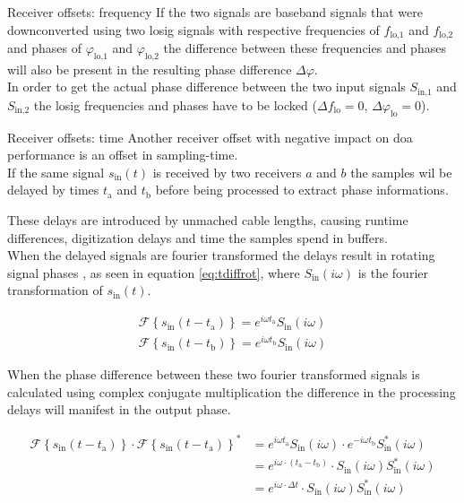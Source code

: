 \begin{subchapter}{Receiver offsets: frequency}
  If the two signals are baseband signals that
  were downconverted using two \gls{losig} signals
  with respective frequencies of $f_\text{lo,1}$ and
  $f_\text{lo,2}$ and phases of $\varphi_\text{lo,1}$
  and $\varphi_\text{lo,2}$ the difference between
  these frequencies and phases will also be present
  in the resulting phase difference $\Delta \varphi$. \\

  In order to get the actual phase difference between
  the two input signals $S_\text{in,1}$ and $S_\text{in,2}$
  the \gls{losig} frequencies and phases have to be
  locked ($\Delta f_\text{lo} = 0$, $\Delta \varphi_\text{lo} = 0$).
\end{subchapter}

\begin{subchapter}{Receiver offsets: time}
  Another receiver offset with negative impact on
  \gls{doa} performance is an offset in sampling-time. \\

  If the same signal $s_\text{in}(t)$ is received
  by two receivers $a$ and $b$ the samples wil be
  delayed by times $t_\text{a}$ and $t_\text{b}$ before
  being processed to extract phase informations.

  These delays are introduced by unmached cable lengths,
  causing runtime differences, digitization delays and
  time the samples spend in buffers. \\

  When the delayed signals are fourier transformed the
  delays result in rotating signal phases
  \cite[p. 802]{bronstein2016}, as seen in equation
  \ref{eq:tdiffrot}, where $S_\text{in}(i \omega)$ is the fourier
  transformation of $s_\text{in}(t)$.

  \begin{align}
    \label{eq:tdiffrot}
    \mathcal{F} \left\{ s_\text{in}(t - t_\text{a}) \right\}
    = e^{i \omega t_\text{a}} S_\text{in}(i \omega) \\
    \mathcal{F} \left\{ s_\text{in}(t - t_\text{b}) \right\}
    = e^{i \omega t_\text{b}} S_\text{in}(i \omega) \nonumber
  \end{align}

  When the phase difference between these two fourier
  transformed signals is calculated using complex conjugate
  multiplication the difference in the processing delays
  will manifest in the output phase.

  \begin{align}
    \mathcal{F} \left\{ s_\text{in}(t - t_\text{a}) \right\} \cdot
    \mathcal{F} \left\{ s_\text{in}(t - t_\text{a}) \right\}^\ast
    &=
    e^{ i \omega t_\text{a}} S_\text{in}(i \omega) \cdot
    e^{-i \omega t_\text{b}} S_\text{in}^\ast(i \omega) \\
    &=
    e^{ i \omega \cdot (t_\text{a} - t_\text{b})} \cdot
    S_\text{in}(i \omega) S_\text{in}^\ast(i \omega) \\
    &=
    e^{ i \omega \cdot \Delta t} \cdot
    S_\text{in}(i \omega) S_\text{in}^\ast(i \omega)
  \end{align}


\end{subchapter}
